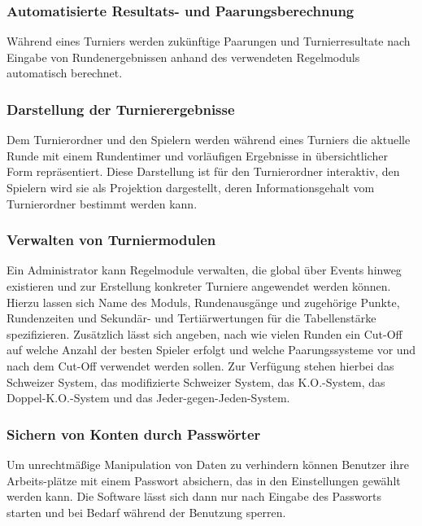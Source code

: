 \documentclass[11pt]{article}
\begin{document}
\subsubsection{Automatisierte Resultats- und Paarungsberechnung}

Während eines Turniers werden zukünftige Paarungen und Turnierresultate nach Eingabe von Rundenergebnissen anhand des verwendeten Regelmoduls automatisch berechnet.

\subsubsection{Darstellung der Turnierergebnisse}

Dem Turnierordner und den Spielern werden während eines Turniers die aktuelle Runde mit einem Rundentimer und vorläufigen Ergebnisse in übersichtlicher Form repräsentiert. Diese Darstellung ist für den Turnierordner interaktiv, den Spielern wird sie als Projektion dargestellt, deren Informationsgehalt vom Turnierordner bestimmt werden kann.

\newpage

\subsubsection{Verwalten von Turniermodulen}

Ein Administrator kann Regelmodule verwalten, die global über Events hinweg existieren und zur Erstellung konkreter Turniere angewendet werden können. Hierzu lassen sich Name des Moduls, Rundenausgänge und zugehörige Punkte, Rundenzeiten und Sekundär- und Tertiärwertungen für die Tabellenstärke spezifizieren. Zusätzlich lässt sich angeben, nach wie vielen Runden ein Cut-Off auf welche Anzahl der besten Spieler erfolgt und welche Paarungssysteme vor und nach dem Cut-Off verwendet werden sollen. Zur Verfügung stehen hierbei das Schweizer System, das modifizierte Schweizer System, das K.O.-System, das Doppel-K.O.-System und das Jeder-gegen-Jeden-System.

\subsubsection{Sichern von Konten durch Passwörter}

Um unrechtmäßige Manipulation von Daten zu verhindern können Benutzer ihre Arbeits-plätze mit einem Passwort absichern, das in den Einstellungen gewählt werden kann. Die Software lässt sich dann nur nach Eingabe des Passworts starten und bei Bedarf während der Benutzung sperren.
\end{document}
